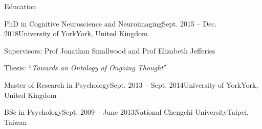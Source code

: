 \documentclass{resume} %
\begin{document}

\begin{rSection}{Education}

  \begin{rSubsection}{PhD in Cognitive Neuroscience and Neuroimaging}{Sept. 2015 -- Dec. 2018}{University of York}{York, United Kingdom}
    \item Supervisors: Prof Jonathan Smallwood and Prof Elizabeth Jefferies
    \item Thesis: ``\textit{Towards an Ontology of Ongoing Thought}''
  \end{rSubsection}

  \begin{EDUrSubsection}{Master of Research in Psychology}{Sept. 2013 -- Sept. 2014}{University of York}{York, United Kingdom}
  \end{EDUrSubsection}

  \begin{EDUrSubsection}{BSc in Psychology}{Sept. 2009 -- June 2013}{National Chengchi University}{Taipei, Taiwan}
  \end{EDUrSubsection}
\end{rSection}


\end{document}
